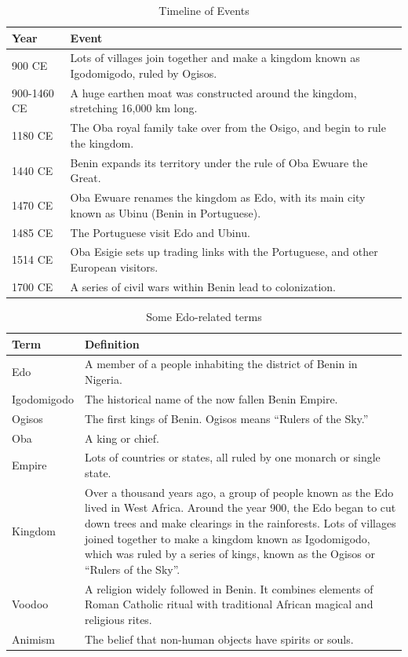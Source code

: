 \begin{table}[htb]
\centering
\caption{Timeline of Events}
\label{tab:timeline}
\begin{tabularx}{\linewidth}{|l|X|}
\hline
\textbf{Year} & \textbf{Event} \\
\hline
900 CE & Lots of villages join together and make a kingdom known as Igodomigodo, ruled by Ogisos. \\
\hline
900-1460 CE & A huge earthen moat was constructed around the kingdom, stretching 16,000 km long. \\
\hline
1180 CE & The Oba royal family take over from the Osigo, and begin to rule the kingdom. \\
\hline
1440 CE & Benin expands its territory under the rule of Oba Ewuare the Great. \\
\hline
1470 CE & Oba Ewuare renames the kingdom as Edo, with its main city known as Ubinu (Benin in Portuguese). \\
\hline
1485 CE & The Portuguese visit Edo and Ubinu. \\
\hline
1514 CE & Oba Esigie sets up trading links with the Portuguese, and other European visitors. \\
\hline
1700 CE & A series of civil wars within Benin lead to colonization. \\
\hline
\end{tabularx}
\end{table}

\begin{table}[htb]
\centering
\caption{Some Edo-related terms}
\label{tab:edo_vocab}
\begin{tabularx}{\linewidth}{|l|X|}
\hline
\textbf{Term} & \textbf{Definition} \\
\hline
Edo & A member of a people inhabiting the district of Benin in Nigeria. \\
\hline
Igodomigodo & The historical name of the now fallen Benin Empire. \\
\hline
Ogisos & The first kings of Benin. Ogisos means “Rulers of the Sky.” \\
\hline
Oba & A king or chief. \\
\hline
Empire & Lots of countries or states, all ruled by one monarch or single state. \\
\hline
Kingdom & Over a thousand years ago, a group of people known as the Edo lived in West Africa. Around the year 900, the Edo began to cut down trees and make clearings in the rainforests. Lots of villages joined together to make a kingdom known as Igodomigodo, which was ruled by a series of kings, known as the Ogisos or “Rulers of the Sky”. \\
\hline
Voodoo & A religion widely followed in Benin. It combines elements of Roman Catholic ritual with traditional African magical and religious rites. \\
\hline
Animism & The belief that non-human objects have spirits or souls. \\
\hline
\end{tabularx}
\end{table}

